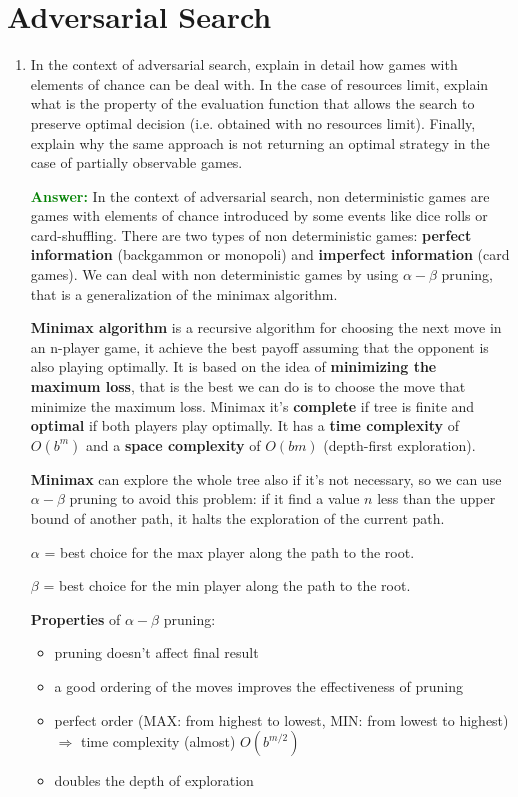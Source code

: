 \documentclass[12pt]{article}
\begin{document}
\section{Adversarial Search}
\begin{enumerate}[label=\textbf{AS.\arabic*}]
    \item In the context of adversarial search, explain in detail how games with elements of chance can be deal with. 
    In the case of resources limit, explain what is the property of the evaluation function that allows the search to 
    preserve optimal decision (i.e. obtained with no resources limit). 
    Finally, explain why the same approach is not returning an optimal strategy in the case of partially observable games.

    \textcolor{green}{\textbf{Answer:}}
    In the context of adversarial search, non deterministic games are games with elements of chance 
    introduced by some events like dice rolls or card-shuffling.
    There are two types of non deterministic games: \textbf{perfect information} (backgammon or monopoli) and \textbf{imperfect information} (card games).
    We can deal with non deterministic games by using $\alpha - \beta$ pruning, that is a generalization of the minimax algorithm.

    \textbf{Minimax algorithm} is a recursive algorithm for choosing the next move in an n-player game, 
    it achieve the best payoff assuming that the opponent is also playing optimally.
    It is based on the idea of \textbf{minimizing the maximum loss}, 
    that is the best we can do is to choose the move that minimize the maximum loss.
    Minimax it's \textbf{complete} if tree is finite and \textbf{optimal} if both players play optimally.
    It has a \textbf{time complexity} of $O(b^m)$ and a \textbf{space complexity} of $O(bm)$ (depth-first exploration).

    \textbf{Minimax} can explore the whole tree also if it's not necessary, 
    so we can use $\alpha - \beta$ pruning to avoid this problem: 
    if it find a value $n$ less than the upper bound of another path, it halts the exploration of the current path.

    $\alpha$ = best choice for the max player along the path to the root.

    $\beta$ = best choice for the min player along the path to the root.

    \textbf{Properties} of $\alpha - \beta$ pruning:
    \begin{itemize}
        \item pruning doesn't affect final result
        \item a good ordering of the moves improves the effectiveness of pruning
        \item perfect order (MAX\@: from highest to lowest, MIN\@: from lowest to highest) $\Rightarrow$ time complexity (almost) $O(b^{m/2})$
        \item doubles the depth of exploration
    \end{itemize}


\end{enumerate}
\end{document}

